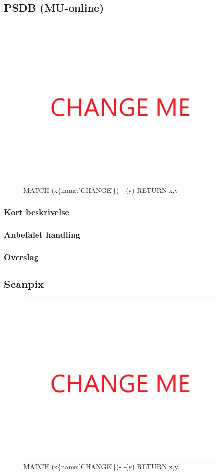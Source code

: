 \documentclass{article}
\begin{document}
\subsection{PSDB (MU-online)}
\begin{figure}[h]
\includegraphics[width=300pt]{CHANGE.PNG}
\caption{MATCH (x\{name:'CHANGE'\})- -(y) RETURN x,y}
\end{figure}
\subsubsection{Kort beskrivelse}
\subsubsection{Anbefalet handling}
\subsubsection{Overslag}
\subsection{Scanpix}
\begin{figure}[h]
\includegraphics[width=300pt]{CHANGE.PNG}
\caption{MATCH (x\{name:'CHANGE'\})- -(y) RETURN x,y}
\end{figure}
\end{document}
